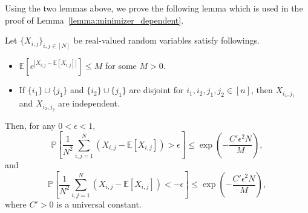 Using the two lemmas above, we prove the following lemma which is used in the proof of Lemma~\ref{lemma:minimizer_dependent}.
\begin{lemma}\label{lemma:dependent_concentration}
Let $\{X_{i,j}\}_{i,j\in [N]}$ be real-valued random variables satisfy followings.
\begin{itemize}
\item $\mathbb{E}\left[ e^{|X_{i,j} - \mathbb{E}[X_{i,j}]|} \right] \leq M$ for some $M>0$.
\item If $\{ i_1\} \cup \{ j_1\}$ and $\{i_2\} \cup \{j_1\}$ are disjoint for $i_1, i_2, j_1, j_2 \in [n]$, then $X_{i_1,j_1}$ and $X_{i_2,j_2}$ are independent.
\end{itemize}
Then, for any $0<\epsilon<1$,
\begin{equation*}
    \mathbb{P} \left[ \frac{1}{N^2}\sum_{i,j=1}^N (X_{i,j} - \mathbb{E}[X_{i,j}])  >\epsilon \right] 
    \leq \exp\left (- \frac{C'\epsilon^2 N}{M} \right ),
\end{equation*}
and
\begin{equation*}
    \mathbb{P} \left[ \frac{1}{N^2}\sum_{i,j=1}^N (X_{i,j} -  \mathbb{E}[X_{i,j}]) < -\epsilon \right] 
    \leq \exp \left ( -\frac{C'\epsilon^2 N}{M} \right ),
\end{equation*}
where $C'>0$ is a universal constant.
\end{lemma}
